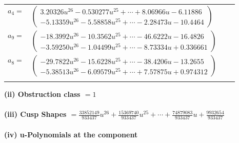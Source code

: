 \documentclass[1p]{elsarticle_modified}
\theoremstyle{definition}
\begin{document}
\begin{tabular}{m{7pt} m{180pt} m{7pt} m{180pt} }
\flushright $a_{4}=$&$\begin{pmatrix}3.20326 u^{26}-0.530277 u^{25}+\cdots+8.06966 u-6.11886\\-5.13359 u^{26}-5.58858 u^{25}+\cdots-2.28473 u-10.4464\end{pmatrix}$ \\
\flushright $a_{9}=$&$\begin{pmatrix}-18.3992 u^{26}-10.3562 u^{25}+\cdots-46.6222 u-16.4826\\-3.59250 u^{26}-1.04499 u^{25}+\cdots-8.73334 u+0.336661\end{pmatrix}$ \\
\flushright $a_{8}=$&$\begin{pmatrix}-29.7822 u^{26}-15.6228 u^{25}+\cdots-38.4206 u-13.2655\\-5.38513 u^{26}-6.09579 u^{25}+\cdots+7.57875 u+0.974312\end{pmatrix}$\\&\end{tabular}
\flushleft \textbf{(ii) Obstruction class $= 1$}\\~\\
\flushleft \textbf{(iii) Cusp Shapes $= \frac{33852149}{933437} u^{26}+\frac{15369740}{933437} u^{25}+\cdots+\frac{74879083}{933437} u+\frac{9932654}{933437}$}\\~\\
\newpage\renewcommand{\arraystretch}{1}
\flushleft \textbf{(iv) u-Polynomials at the component}\newline \\
\end{document}
